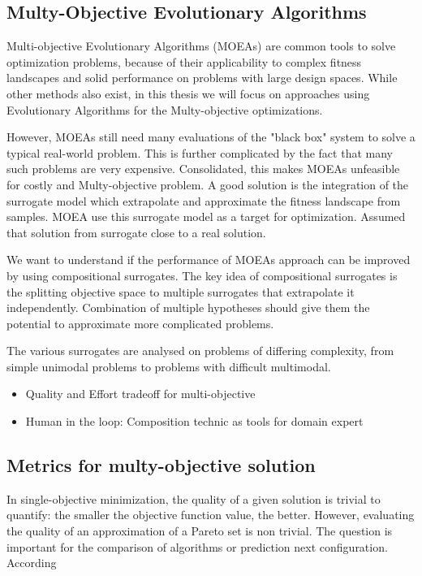         \subsection{Multy-Objective Evolutionary Algorithms}
            Multi-objective Evolutionary Algorithms (MOEAs) are common tools to solve optimization problems, 
            because of their applicability to complex fitness landscapes and solid performance on problems with large design spaces. 
            While other methods also exist, in this thesis we will focus on approaches using Evolutionary Algorithms for the Multy-objective optimizations.

            However, MOEAs still need many evaluations of the "black box" system to solve a typical real-world problem. 
            This is further complicated by the fact that many such problems are very expensive. Consolidated, this makes MOEAs unfeasible for costly and Multy-objective problem.
            A good solution is the integration of the surrogate model which extrapolate and approximate the fitness landscape from samples. MOEA use this surrogate model 
            as a target for optimization. Assumed that solution from surrogate close to a real solution.
            
            We want to understand if the performance of MOEAs approach can be improved by using compositional surrogates. 
            The key idea of compositional surrogates is the splitting objective space to multiple surrogates that extrapolate it independently. 
            Combination of multiple hypotheses should give them the potential to approximate more complicated problems. 

            The various surrogates are analysed on problems of differing complexity, from simple unimodal problems to problems with difficult multimodal. 

            \begin{itemize}
                \item Quality and Effort tradeoff for multi-objective
                \item Human in the loop: Composition technic as tools for domain expert
            \end{itemize}


        \subsection{Metrics for multy-objective solution}
            In single-objective minimization, the quality of a given solution is trivial to quantify:
            the smaller the objective function value, the better. However, evaluating the quality of an approximation of a Pareto set is non trivial.
            The question is important for the comparison of algorithms or prediction next configuration. According

